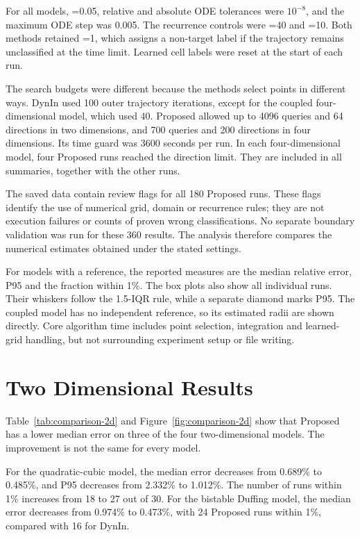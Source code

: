 For all models, =0.05, relative and absolute ODE tolerances were $10^{-8}$, and the maximum ODE step was 0.005. The recurrence controls were =40 and =10. Both methods retained =1, which assigns a non-target label if the trajectory remains unclassified at the time limit. Learned cell labels were reset at the start of each run.

The search budgets were different because the methods select points in different ways. DynIn used 100 outer trajectory iterations, except for the coupled four-dimensional model, which used 40. Proposed allowed up to 4096 queries and 64 directions in two dimensions, and 700 queries and 200 directions in four dimensions. Its time guard was 3600 seconds per run. In each four-dimensional model, four Proposed runs reached the direction limit. They are included in all summaries, together with the other runs.

The saved data contain review flags for all 180 Proposed runs. These flags identify the use of numerical grid, domain or recurrence rules; they are not execution failures or counts of proven wrong classifications. No separate boundary validation was run for these 360 results. The analysis therefore compares the numerical estimates obtained under the stated settings.

\begin{revision}
For models with a reference, the reported measures are the median relative error, P95 and the fraction within 1\%. The box plots also show all individual runs. Their whiskers follow the 1.5-IQR rule, while a separate diamond marks P95. The coupled model has no independent reference, so its estimated radii are shown directly. Core algorithm time includes point selection, integration and learned-grid handling, but not surrounding experiment setup or file writing.
\end{revision}

\section{Two Dimensional Results}



Table~\ref{tab:comparison-2d} and Figure~\ref{fig:comparison-2d} show that Proposed has a lower median error on three of the four two-dimensional models. The improvement is not the same for every model.

For the quadratic-cubic model, the median error decreases from 0.689\% to 0.485\%, and P95 decreases from 2.332\% to 1.012\%. The number of runs within 1\% increases from 18 to 27 out of 30. For the bistable Duffing model, the median error decreases from 0.974\% to 0.473\%, with 24 Proposed runs within 1\%, compared with 16 for DynIn.

